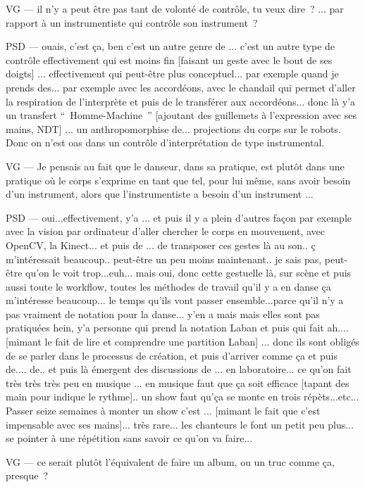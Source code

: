VG — il n'y a peut être pas tant de volonté de contrôle, tu veux dire ? ... par rapport à un instrumentiste qui contrôle son instrument ? 

PSD — ouais, c'est ça, ben c'est un autre genre de ... c'est un autre type de contrôle effectivement qui est moins fin [faisant un geste avec le bout de ses doigts] ... effectivement qui peut-être plus conceptuel... par exemple quand je prends des... par exemple avec les accordéons, avec le chandail qui permet d'aller la respiration de l'interprète et puis de le transférer aux accordéons... donc là y'a un transfert “ Homme-Machine ” [ajoutant des guillemets à l'expression avec ses mains, NDT] ... un anthropomorphise de... projections du corps sur le robots. Donc on n'est oas dans un contrôle d'interprétation de type instrumental. 

VG — Je pensais au fait que le danseur, dans sa pratique, est plutôt dans une pratique où le corps s'exprime en tant que tel, pour lui même, sans avoir besoin d'un instrument, alors que l'instrumentiste a besoin d'un instrument ... 

PSD — oui...effectivement, y'a ... et puis il y a plein d'autres façon par exemple avec la vision par ordinateur d'aller chercher le corps en mouvement, avec OpenCV, la Kinect... et puis de ... de transposer ces gestes là au son.. ç m'intéressait beaucoup.. peut-être un peu moins maintenant.. je sais pas, peut-être qu'on le voit trop...euh... mais oui, donc cette gestuelle là, sur scène et puis aussi toute le workflow, toutes les méthodes de travail qu'il y a en danse ça m'intéresse beaucoup... le temps qu'ils vont passer ensemble...parce qu'il n'y a pas vraiment de notation pour la danse... y'en a mais mais elles sont pas pratiquées hein, y'a personne qui prend la notation Laban et puis qui fait ah.... [mimant le fait de lire et comprendre une partition Laban] ... donc ils sont obligés de se parler dans le processus de création, et puis d'arriver comme ça et puis de.... de.. et puis là émergent des discussions de ... en laboratoire... ce qu'on fait très très très peu en musique ... en musique faut que ça soit efficace [tapant des main pour indique le rythme].. un show faut qu'ça se monte en trois répèts...etc... Passer seize semaines à monter un show c'est ... [mimant le fait que c'est impensable avec ses mains]... très rare... les chanteurs le font un petit peu plus... se pointer à une répétition sans savoir ce qu'on va faire...  

VG — ce serait plutôt l'équivalent de faire un album, ou un truc comme ça, presque ? 

